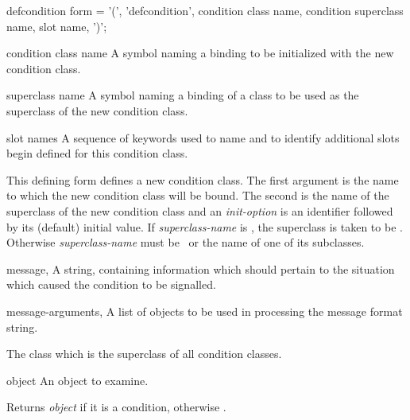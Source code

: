\begin{optDefinition}
%
\label{defcondition}
%
\Syntax
\label{defcondition-syntax}
\savesyntax{}\vbox{\syntax
defcondition form
   = '(', 'defcondition',
     condition class name,
     condition superclass name,
     {slot name}, ')';
\endsyntax}
%
\begin{arguments}
    \item[condition class name] A symbol naming a binding to be initialized with
    the new condition class.

    \item[superclass name] A symbol naming a binding of a class to be used as
    the superclass of the new condition class.

    \item[slot names] A sequence of keywords used to name and to
    identify additional slots begin defined for this condition class.
\end{arguments}
%
\remarks%
This defining form defines a new condition class.  The first argument is the
name to which the new condition class will be bound.  The second is the name of
the superclass of the new condition class and an {\em init-option\/} is an
identifier followed by its (default) initial value.  If {\em superclass-name\/}
is \nil{}, the superclass is taken to be .  Otherwise {\em
    superclass-name\/} must be \ or the name of one of its
subclasses.

\label{\conditionlabel{condition}}
%
\begin{initoptions}
    \item[message, \classref{string}] A string, containing information which
    should pertain to the situation which caused the condition to be signalled.

    \item[message-arguments, \classref{list}] A list of objects to be used in
    processing the message format string.
\end{initoptions}
%
\remarks%
The class which is the superclass of all condition classes.

%
\begin{arguments}
    \item[object] An object to examine.
\end{arguments}
%
\result%
Returns {\em object\/} if it is a condition, otherwise \nil{}.


\end{optDefinition}
